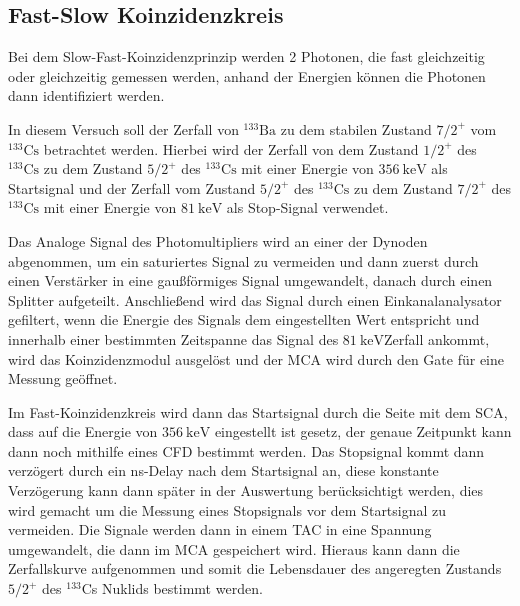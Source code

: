 \documentclass{article}
\begin{document}
\subsection*{Fast-Slow Koinzidenzkreis}
Bei dem Slow-Fast-Koinzidenzprinzip werden 2 Photonen, die fast gleichzeitig oder gleichzeitig gemessen werden, 
anhand der Energien können die Photonen dann identifiziert werden. 

In diesem Versuch soll der Zerfall von $^{133}\text{Ba}$ zu dem stabilen Zustand $7/2^+$ vom $^{133}\text{Cs}$ betrachtet werden. 
Hierbei wird der Zerfall von dem Zustand $1/2^+$ des $^{133}\text{Cs}$ zu dem Zustand $5/2^+$ des $^{133}\text{Cs}$ mit einer Energie von $\SI{356}{\kilo\electronvolt}$ als Startsignal 
und der Zerfall vom Zustand $5/2^+$ des $^{133}\text{Cs}$ zu dem Zustand $7/2^+$ des $^{133}\text{Cs}$ mit einer Energie von $\SI{81}{\kilo\electronvolt}$ als Stop-Signal verwendet.

Das Analoge Signal des Photomultipliers wird an einer der Dynoden abgenommen, um ein saturiertes Signal zu vermeiden und dann zuerst durch einen Verstärker in eine gaußförmiges Signal umgewandelt, 
danach durch einen Splitter aufgeteilt.
Anschließend wird das Signal durch einen Einkanalanalysator gefiltert, wenn die Energie des Signals dem eingestellten Wert entspricht und 
innerhalb einer bestimmten Zeitspanne das Signal des $\SI{81}{\kilo\electronvolt}$Zerfall ankommt, wird das Koinzidenzmodul ausgelöst und 
der MCA wird durch den Gate für eine Messung geöffnet. 

Im Fast-Koinzidenzkreis wird dann das Startsignal durch die Seite mit dem SCA, 
dass auf die Energie von $\SI{356}{\kilo\electronvolt}$ eingestellt ist gesetz, der genaue Zeitpunkt kann dann noch mithilfe eines CFD bestimmt werden.
Das Stopsignal kommt dann verzögert durch ein ns-Delay nach dem Startsignal an, diese konstante
Verzögerung kann dann später in der Auswertung berücksichtigt werden, dies wird gemacht um die Messung eines Stopsignals vor dem Startsignal zu vermeiden.
Die Signale werden dann in einem TAC in eine Spannung umgewandelt, die dann im MCA gespeichert wird. 
Hieraus kann dann die Zerfallskurve aufgenommen und somit die Lebensdauer des angeregten Zustands $5/2^+$ des $^{133}$Cs Nuklids bestimmt werden.




\end{document}
